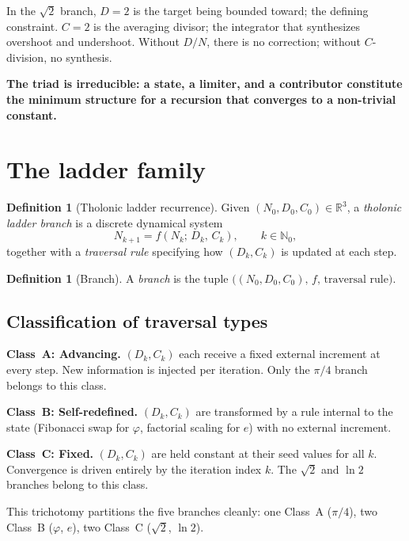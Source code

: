 \documentclass[12pt]{article}
\theoremstyle{definition}
\newtheorem{definition}[theorem]{Definition}
\theoremstyle{remark}
\begin{document}
In the $\sqrt{2}$ branch, $D = 2$ is the target being bounded toward; the defining
constraint. $C = 2$ is the averaging divisor; the integrator that synthesizes overshoot
and undershoot. Without $D/N$, there is no correction; without $C$-division, no synthesis.

\textbf{The triad is irreducible: a state, a limiter, and a contributor constitute the
minimum structure for a recursion that converges to a non-trivial constant.}

\section{The ladder family}\label{sec:ladder}

\begin{definition}[Tholonic ladder recurrence]\label{def:ladder}
Given $(N_0, D_0, C_0) \in \mathbb{R}^3$, a \emph{tholonic ladder branch} is a discrete
dynamical system
\[
  N_{k+1} = f(N_k;\, D_k,\, C_k), \qquad k \in \mathbb{N}_0,
\]
together with a \emph{traversal rule} specifying how $(D_k, C_k)$ is updated at each step.
\end{definition}

\begin{definition}[Branch]\label{def:branch}
A \emph{branch} is the tuple $\bigl((N_0, D_0, C_0),\, f,\, \text{traversal rule}\bigr)$.
\end{definition}

\subsection{Classification of traversal types}\label{subsec:traversal}

\textbf{Class~A: Advancing.} $(D_k, C_k)$ each receive a fixed external increment at every
step. New information is injected per iteration. Only the $\pi/4$ branch belongs to this class.

\textbf{Class~B: Self-redefined.} $(D_k, C_k)$ are transformed by a rule internal to the state
(Fibonacci swap for $\varphi$, factorial scaling for $e$) with no external increment.

\textbf{Class~C: Fixed.} $(D_k, C_k)$ are held constant at their seed values for all $k$.
Convergence is driven entirely by the iteration index $k$. The $\sqrt{2}$ and $\ln 2$
branches belong to this class.

This trichotomy partitions the five branches cleanly: one Class~A ($\pi/4$), two Class~B
($\varphi$, $e$), two Class~C ($\sqrt{2}$, $\ln 2$).
\end{document}
